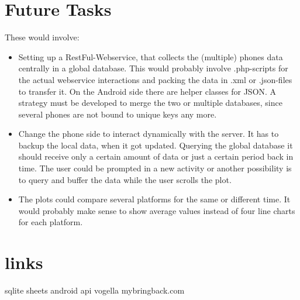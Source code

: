 \documentclass[11pt,oneside,a4paper]{scrartcl}
\begin{document}
\section{Future Tasks}
These would involve:

\begin{itemize}
\item
Setting up a RestFul-Webservice, that collects the (multiple) phones data centrally in a global database. This would probably involve .php-scripts for the actual webservice interactions and packing the data in .xml or .json-files to transfer it. On the Android side there are helper classes for JSON.
A strategy must be developed to merge the two or multiple databases, since several phones are not bound to unique keys any more. 

\item
Change the phone side to interact dynamically with the server. It has to backup the local data, when it got updated. Querying the global database it should receive only a certain amount of data or just a certain period back in time. The user could be prompted in a new activity or another possibility is to query and buffer the data while the user scrolls the plot.

\item
The plots could compare several platforms for the same or different time. It would probably make sense to show average values instead of four line charts for each platform.

\end{itemize}

\section{links}
sqlite sheets
android api
vogella
mybringback.com
\end{document}

